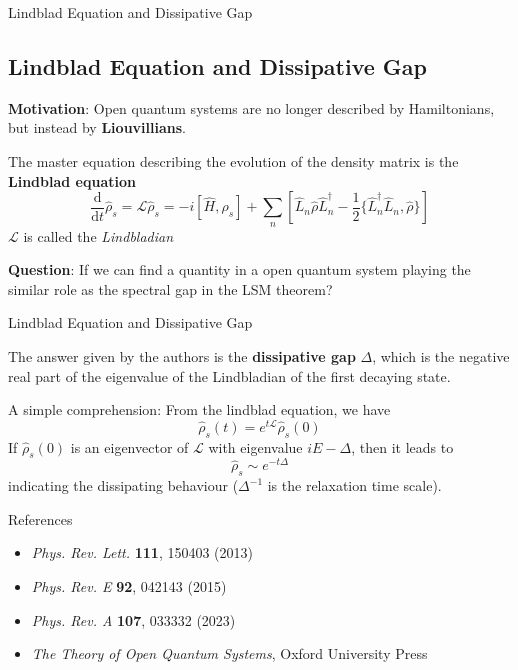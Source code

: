 \documentclass[professionalfont]{beamer}
\theoremstyle{definition}
\newcommand{\dif}[1]{\frac{\mathrm{d}}{\mathrm{d} #1}}
\newcommand{\lrm}[1]{\left[#1\right]}
\begin{document}
\begin{frame}{Lindblad Equation and Dissipative Gap}
\subsection{Lindblad Equation and Dissipative Gap}

{\textbf{Motivation}}: Open quantum systems are no longer described by Hamiltonians, but instead by \textbf{Liouvillians}.

\vspace{0.3cm}

The master equation describing the evolution of the density matrix is the \textbf{Lindblad equation}
\[\dif{t}\hat{\rho}_s = \mathcal{L}\hat{\rho}_s = -i[\hat{H},\rho_s] + \sum_{n}\lrm{\hat{L}_n\hat{\rho}\hat{L}^\dagger_n - \frac{1}{2}\{\hat{L}^\dagger_n\hat{L}_n,\hat{\rho}\}}\]
$\mathcal{L}$ is called the \textit{Lindbladian}

\vspace{0.3cm}

\textbf{Question}: If we can find a quantity in a open quantum system playing the similar role as the spectral gap in the LSM theorem? 
\end{frame}
\begin{frame}{Lindblad Equation and Dissipative Gap}

The answer given by the authors is the \textbf{dissipative gap} $\Delta$, which is the negative real part of the eigenvalue of the Lindbladian of the first decaying state.

\vspace{0.2cm}

{\footnotesize
A simple comprehension: From the lindblad equation, we have 
\[\hat{\rho}_s(t) = e^{t\mathcal{L}}\hat{\rho}_s(0)\]
If $\hat{\rho}_s(0)$ is an eigenvector of $\mathcal{L}$ with eigenvalue $iE-\Delta$, then it leads to
\[\hat{\rho}_s \sim e^{-t \Delta }\]
indicating the dissipating behaviour ($\Delta^{-1}$ is the relaxation time scale). 
}

\vspace{0.5cm}

{\tiny
References
\begin{itemize}
    \item \textit{Phys. Rev. Lett.} \textbf{111}, 150403 (2013)
    \item \textit{Phys. Rev. E} \textbf{92}, 042143 (2015)
    \item \textit{Phys. Rev. A} \textbf{107}, 033332 (2023)
    \item \textit{The Theory of Open Quantum Systems}, Oxford University Press
\end{itemize}}
    
\end{frame}
\end{document}
